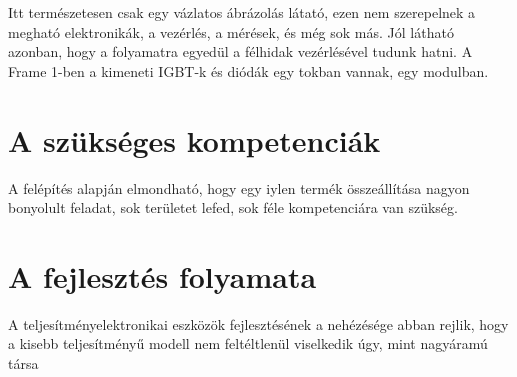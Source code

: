 Itt természetesen csak egy vázlatos ábrázolás látató, ezen nem szerepelnek a megható elektronikák, a vezérlés, a mérések, és még sok más. Jól látható azonban, hogy a folyamatra egyedül a félhidak vezérlésével tudunk hatni. A Frame 1-ben a kimeneti IGBT-k és diódák egy tokban vannak, egy modulban. 


\section{A szükséges kompetenciák}

A felépítés alapján elmondható, hogy egy iylen termék összeállítása nagyon bonyolult feladat, sok területet lefed, sok féle kompetenciára van szükség.

\section{A fejlesztés folyamata}

A teljesítményelektronikai eszközök fejlesztésének a nehézésége abban rejlik, hogy a kisebb teljesítményű modell nem feltéltlenül viselkedik úgy, mint nagyáramú társa

